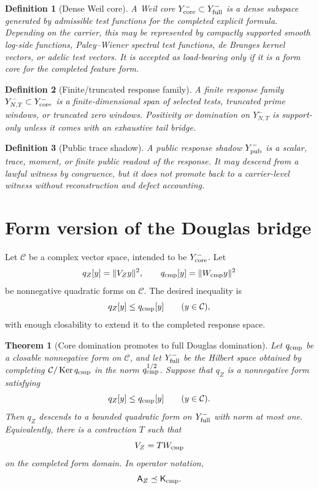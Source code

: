 \documentclass[11pt]{article}
\newtheorem{theorem}{Theorem}
\newtheorem{definition}{Definition}
\newcommand{\AZ}{\mathsf A_Z}
\newcommand{\Kcmp}{\mathsf K_{\rm cmp}}
\newcommand{\Yfull}{Y^-_{\rm full}}
\newcommand{\Ycore}{Y^-_{\rm core}}
\newcommand{\Yfin}{Y^-_{N,T}}
\newcommand{\Ypub}{Y^-_{\rm pub}}
\newcommand{\Ker}{\operatorname{Ker}}
\begin{document}
\begin{definition}[Dense Weil core]
A Weil core \(\Ycore\subset \Yfull\) is a dense subspace generated by admissible test functions for the completed explicit formula.  Depending on the carrier, this may be represented by compactly supported smooth log-side functions, Paley--Wiener spectral test functions, de Branges kernel vectors, or adelic test vectors.  It is accepted as load-bearing only if it is a form core for the completed feature form.
\end{definition}

\begin{definition}[Finite/truncated response family]
A finite response family \(\Yfin\subset\Ycore\) is a finite-dimensional span of selected tests, truncated prime windows, or truncated zero windows.  Positivity or domination on \(\Yfin\) is support-only unless it comes with an exhaustive tail bridge.
\end{definition}

\begin{definition}[Public trace shadow]
A public response shadow \(\Ypub\) is a scalar, trace, moment, or finite public readout of the response.  It may descend from a lawful witness by congruence, but it does not promote back to a carrier-level witness without reconstruction and defect accounting.
\end{definition}

\section{Form version of the Douglas bridge}
Let \(\mathcal C\) be a complex vector space, intended to be \(\Ycore\).  Let
\[
  q_Z[y]=\|V_Zy\|^2,
  \qquad
  q_{\rm cmp}[y]=\|W_{\rm cmp}y\|^2
\]
be nonnegative quadratic forms on \(\mathcal C\).  The desired inequality is
\[
  q_Z[y]\le q_{\rm cmp}[y]
  \qquad (y\in \mathcal C),
\]
with enough closability to extend it to the completed response space.

\begin{theorem}[Core domination promotes to full Douglas domination]
Let \(q_{\rm cmp}\) be a closable nonnegative form on \(\mathcal C\), and let \(\Yfull\) be the Hilbert space obtained by completing \(\mathcal C/\Ker q_{\rm cmp}\) in the norm \(q_{\rm cmp}^{1/2}\).  Suppose that \(q_Z\) is a nonnegative form satisfying
\[
  q_Z[y]\le q_{\rm cmp}[y]
  \qquad (y\in \mathcal C).
\]
Then \(q_Z\) descends to a bounded quadratic form on \(\Yfull\) with norm at most one.  Equivalently, there is a contraction \(T\) such that
\[
  V_Z = T W_{\rm cmp}
\]
on the completed form domain.  In operator notation,
\[
  \AZ\preceq \Kcmp .
\]
\end{theorem}
\end{document}
